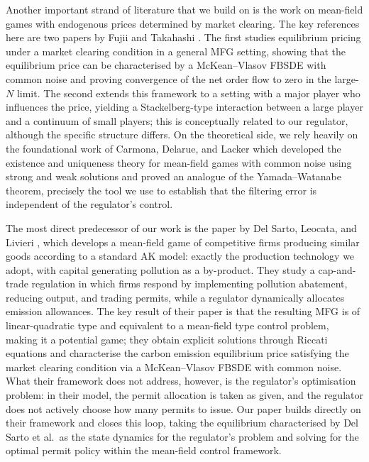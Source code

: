 \documentclass[11pt,twoside]{amsart}
\theoremstyle{definition}
\numberwithin{equation}{section}
\begin{document}
Another important strand of literature that we build on is the work on mean-field games with endogenous prices determined by market clearing. The key references here are two papers by Fujii and Takahashi \cite{fujii2022equilibrium, fujii2022mean}. The first studies equilibrium pricing under a market clearing condition in a general MFG setting, showing that the equilibrium price can be characterised by a McKean–Vlasov FBSDE with common noise and proving convergence of the net order flow to zero in the large-$N$ limit. The second extends this framework to a setting with a major player who influences the price, yielding a Stackelberg-type interaction between a large player and a continuum of small players; this is conceptually related to our regulator, although the specific structure differs. On the theoretical side, we rely heavily on the foundational work of Carmona, Delarue, and Lacker \cite{carmona2016} which developed the existence and uniqueness theory for mean-field games with common noise using strong and weak solutions and proved an analogue of the Yamada–Watanabe theorem, precisely the tool we use to establish that the filtering error is independent of the regulator's control. 

The most direct predecessor of our work is the paper by Del Sarto, Leocata, and Livieri \cite{del2024mean}, which develops a mean-field game of competitive firms producing similar goods according to a standard AK model: exactly the production technology we adopt, with capital generating pollution as a by-product. They study a cap-and-trade regulation in which firms respond by implementing pollution abatement, reducing output, and trading permits, while a regulator dynamically allocates emission allowances. The key result of their paper is that the resulting MFG is of linear-quadratic type and equivalent to a mean-field type control problem, making it a potential game; they obtain explicit solutions through Riccati equations and characterise the carbon emission equilibrium price satisfying the market clearing condition via a McKean–Vlasov FBSDE with common noise. What their framework does not address, however, is the regulator's optimisation problem: in their model, the permit allocation is taken as given, and the regulator does not actively choose how many permits to issue. Our paper builds directly on their framework and closes this loop, taking the equilibrium characterised by Del Sarto et al.\ as the state dynamics for the regulator's problem and solving for the optimal permit policy within the mean-field control framework.
\end{document}
